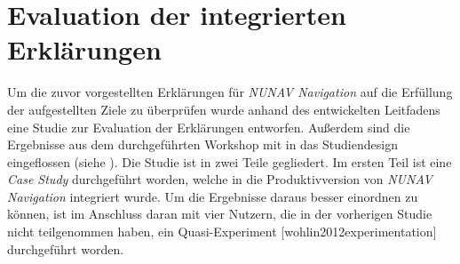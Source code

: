 \section{Evaluation der integrierten Erklärungen}

Um die zuvor vorgestellten Erklärungen für \textit{NUNAV Navigation} auf die Erfüllung der aufgestellten Ziele zu überprüfen wurde anhand des entwickelten Leitfadens eine Studie zur Evaluation der Erklärungen entworfen. Außerdem sind die Ergebnisse aus dem durchgeführten Workshop mit in das Studiendesign eingeflossen (siehe ). Die Studie ist in zwei Teile gegliedert. Im ersten Teil ist eine \textit{Case Study} \cite{wohlin2012experimentation} durchgeführt worden, welche in die Produktivversion von \textit{NUNAV Navigation} integriert wurde. Um die Ergebnisse daraus besser einordnen zu können, ist im Anschluss daran mit vier Nutzern, die in der vorherigen Studie nicht teilgenommen haben, ein Quasi-Experiment [wohlin2012experimentation] durchgeführt worden.







